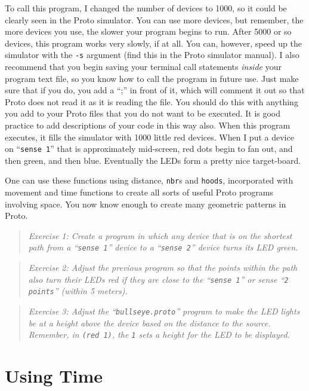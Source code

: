 \documentclass{article}
\newcommand\problem[1]{\begin{quote}{\em #1}\end{quote}}
\newcommand\var[1]{{\tt #1}}
\newcommand\qvar[1]{``{\tt #1}''}
\begin{document}
To call this program, I changed the number of devices to 1000, so it
could be clearly seen in the Proto simulator.  You can use more
devices, but remember, the more devices you use, the slower your
program begins to run.  After 5000 or so devices, this program works
very slowly, if at all.  You can, however, speed up the simulator with
the \var{-s} argument (find this in the Proto simulator manual).  I
also recommend that you begin saving your terminal call statements
{\em inside} your program text file, so you know how to call the
program in future use.  Just make sure that if you do, you add a “;”
in front of it, which will comment it out so that Proto does not read
it as it is reading the file.  You should do this with anything you
add to your Proto files that you do not want to be executed.  It is
good practice to add descriptions of your code in this way also.  When
this program executes, it fills the simulator with 1000 little red
devices.  When I put a device on \qvar{sense 1} that is approximately
mid-screen, red dots begin to fan out, and then green, and then blue.
Eventually the LEDs form a pretty nice target-board.

One can use these functions using distance, \var{nbr}s and
\var{hoods}, incorporated with movement and time functions to create
all sorts of useful Proto programs involving space.  You now know enough
to create many geometric patterns in Proto.

\problem{Exercise 1: Create a program in which any device that is on
  the shortest path from a \qvar{sense 1} device to a \qvar{sense 2}
  device turns its LED green.}

\problem{Exercise 2: Adjust the previous program so that the points
  within the path also turn their LEDs red if they are close to the
  \qvar{sense 1} or sense \qvar{2 points} (within 5 meters).}

\problem{Exercise 3: Adjust the \qvar{bullseye.proto} program to make
  the LED lights be at a height above the device based on the distance
  to the source. Remember, in \var{(red 1)}, the \var{1} sets a height
  for the LED to be displayed.}

\section{Using Time}
\end{document}
